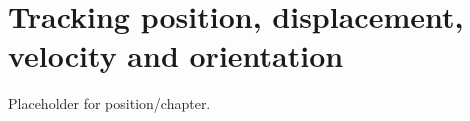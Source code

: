 \setchapterpreamble[u]{\margintoc}
\chapter{\color{gray} Tracking position, displacement, velocity and orientation \color{black}}

Placeholder for position/\etc chapter.

%
